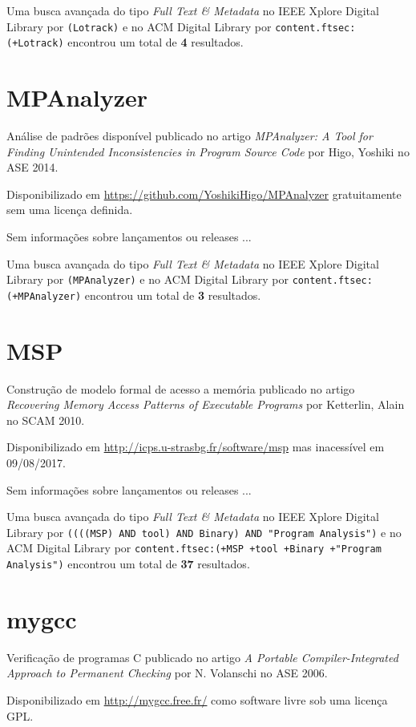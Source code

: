 Uma busca avançada do tipo {\it Full Text \& Metadata} no IEEE Xplore Digital Library por
\texttt{(Lotrack)}
e no ACM Digital Library por
\texttt{content.ftsec:(+Lotrack)}
encontrou um total de
{\bf 4}
resultados.

\section{MPAnalyzer}

Análise de padrões disponível
publicado no artigo {\it MPAnalyzer: A Tool for Finding Unintended Inconsistencies in Program Source Code}
por Higo, Yoshiki
no ASE 2014.

Disponibilizado em \url{https://github.com/YoshikiHigo/MPAnalyzer}
gratuitamente
sem uma licença definida.

Sem informações sobre lançamentos ou releases ...


Uma busca avançada do tipo {\it Full Text \& Metadata} no IEEE Xplore Digital Library por
\texttt{(MPAnalyzer)}
e no ACM Digital Library por
\texttt{content.ftsec:(+MPAnalyzer)}
encontrou um total de
{\bf 3}
resultados.

\section{MSP}

Construção de modelo formal de acesso a memória
publicado no artigo {\it Recovering Memory Access Patterns of Executable Programs}
por Ketterlin, Alain
no SCAM 2010.

Disponibilizado em \url{http://icps.u-strasbg.fr/software/msp}
mas inacessível em 09/08/2017.

Sem informações sobre lançamentos ou releases ...


Uma busca avançada do tipo {\it Full Text \& Metadata} no IEEE Xplore Digital Library por
\texttt{((((MSP) AND tool) AND Binary) AND "Program Analysis")}
e no ACM Digital Library por
\texttt{content.ftsec:(+MSP +tool +Binary +"Program Analysis")}
encontrou um total de
{\bf 37}
resultados.

\section{mygcc}

Verificação de programas C
publicado no artigo {\it A Portable Compiler-Integrated Approach to Permanent Checking}
por N. Volanschi
no ASE 2006.

Disponibilizado em \url{http://mygcc.free.fr/}
como software livre
sob uma licença GPL.

